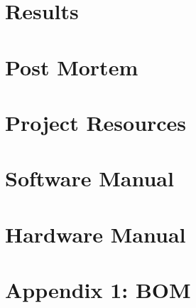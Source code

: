 \documentclass[hidelinks, 12pt]{article} %
\begin{document}
\section{Results}
\label{Results}

\pagebreak
\newpage
\section*{Post Mortem}
\label{Post Mortem}

\pagebreak
\newpage
\section*{Project Resources}
\label{Project Resources}

\pagebreak
\newpage
\section*{Software Manual}
\label{Software Manual}

\pagebreak
\newpage
\section*{Hardware Manual}
\label{Hardware Manual}

\pagebreak

\newpage
\appendix
\renewcommand\thesection{}

\section*{Appendix 1: BOM}
{}

\end{document}
